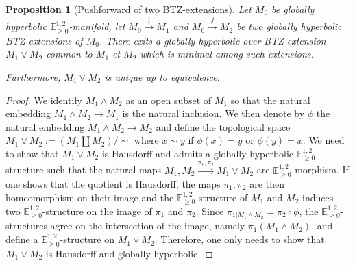 \documentclass[a4paper,12pt]{article}
\newcommand{\mass}[1]{{\mathbb E}^{1,2}_{#1}}
\def\pgcd{M_1\wedge M_2}
\def\ppcm{M_1\vee M_2}
\newtheorem{propou}[lemou]{Proposition}
\begin{document}
		\begin{propou}[Pushforward of two BTZ-extensions]\label{btzprop:ppcm} \label{prop:ppcm}Let $M_0$ be globally hyperbolic $\mass{\geq0}$-manifold, let $M_0\xrightarrow{i} M_1$ and $M_0 \xrightarrow{j} M_2$
			be two globally hyperbolic BTZ-extensions of $M_0$. There exits a globally hyperbolic over-BTZ-extension $\ppcm$ common to
			$M_1$ et $M_2$	which is minimal among such extensions.

			Furthermore, $\ppcm$ is unique up to equivalence.
	
		\end{propou}
		\begin{proof}
			
			We identify $\pgcd$ as an open subset of $M_1$ so that the natural embedding $\pgcd \rightarrow M_1$ is the natural inclusion. We then denote by $\phi$ the natural embedding $\pgcd \rightarrow M_2$ and define the topological space $\ppcm:= (M_1\coprod M_2)/\sim$ where $x\sim y$ if $\phi(x)=y$ or $\phi(y)=x$. We need to show that $\ppcm$ is Hausdorff and admits a globally hyperbolic $\mass{\geq0}$-structure such that the natural maps $M_1,M_2\xrightarrow{\pi_1,\pi_2} \ppcm$ are $\mass{\geq0}$-morphism. If one shows that the quotient is Hausdorff, the maps $\pi_1,\pi_2$ are then homeomorphism on their image and the $\mass{\geq0}$-structure of $M_1$ and $M_2$ induces two
$\mass{\geq0}$-structure on the image of $\pi_1$ and $\pi_2$. 	
Since $\pi_{1|\pgcd} = \pi_2\circ\phi$, the $\mass{\geq0}$-structures agree on the intersection of the image, namely $\pi_1(\pgcd)$, and define a $\mass{\geq0}$-structure on $\ppcm$. Therefore, one only needs to show that $\ppcm$ is Hausdorff and globally hyperbolic.
			

\end{proof}
\end{document}
